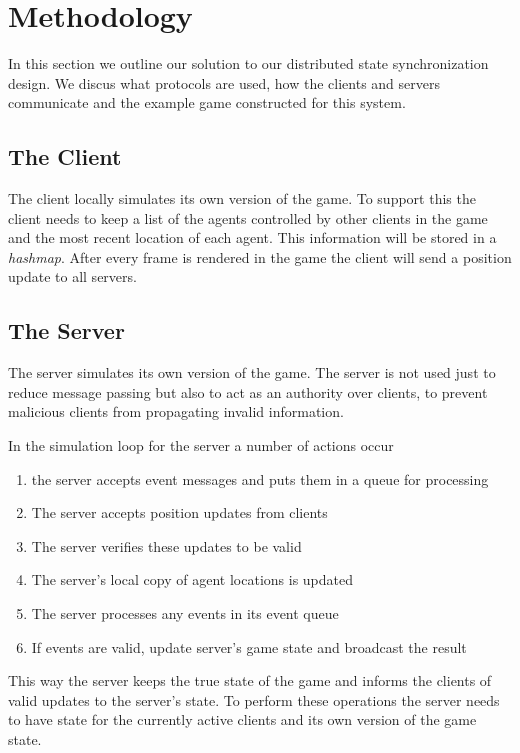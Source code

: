 
\section{Methodology}
\label{sec:methodology}

	In this section we outline our solution to our distributed state synchronization design. We discus what protocols are used, how the clients and servers communicate and the example game constructed for this system.
	
\subsection{The Client}

	The client locally simulates its own version of the game. To support this the client needs to keep a list of the agents controlled by other clients in the game and the most recent location of each agent. This information will be stored in a \emph{hashmap}. After every frame is rendered in the game the client will send a position update to all servers.
	
\subsection{The Server}

	The server simulates its own version of the game. The server is not used just to reduce message passing but also to act as an authority over clients, to prevent malicious clients from propagating invalid information.
	
	In the simulation loop for the server a number of actions occur
	\begin{enumerate}[topsep=2pt,itemsep=-1ex,partopsep=1ex,parsep=1ex]
		\item the server accepts event messages and puts them in a queue for processing
		\item The server accepts position updates from clients
		\item The server verifies these updates to be valid
		\item The server's local copy of agent locations is updated
		\item The server processes any events in its event queue
		\item If events are valid, update server's game state and broadcast the result
	\end{enumerate}
	
	This way the server keeps the true state of the game and informs the clients of valid updates to the server's state. To perform these operations the server needs to have state for the currently active clients and its own version of the game state.

